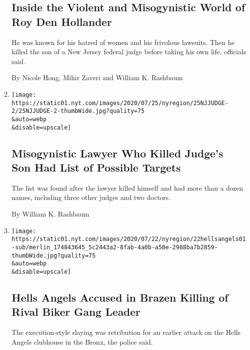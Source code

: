 \begin{enumerate}
  \hypertarget{inside-the-violent-and-misogynistic-world-of-roy-den-hollander}{%
  \subsection{Inside the Violent and Misogynistic World of Roy Den
  Hollander}\label{inside-the-violent-and-misogynistic-world-of-roy-den-hollander}}

  He was known for his hatred of women and his frivolous lawsuits. Then
  he killed the son of a New Jersey federal judge before taking his own
  life, officials said.

  By Nicole Hong, Mihir Zaveri and William K. Rashbaum
\item
  \href{/2020/07/25/nyregion/roy-den-hollander-esther-salas-list.html}{}

  \texttt{[image: https://static01.nyt.com/images/2020/07/25/nyregion/25NJJUDGE-2/25NJJUDGE-2-thumbWide.jpg?quality=75\\\&auto=webp\\\&disable=upscale]}

  \hypertarget{misogynistic-lawyer-who-killed-judges-son-had-list-of-possible-targets}{%
  \subsection{Misogynistic Lawyer Who Killed Judge's Son Had List of
  Possible
  Targets}\label{misogynistic-lawyer-who-killed-judges-son-had-list-of-possible-targets}}

  The list was found after the lawyer killed himself and had more than a
  dozen names, including three other judges and two doctors.

  By William K. Rashbaum
\item
  \href{/2020/07/22/nyregion/hells-angels-bronx-pagans-murder.html}{}

  \texttt{[image: https://static01.nyt.com/images/2020/07/22/nyregion/22hellsangels01-sub/merlin\_174843645\_5c2443a2-8fab-4a0b-a50e-2988ba7b2859-thumbWide.jpg?quality=75\\\&auto=webp\\\&disable=upscale]}

  \hypertarget{hells-angels-accused-in-brazen-killing-of-rival-biker-gang-leader}{%
  \subsection{Hells Angels Accused in Brazen Killing of Rival Biker Gang
  Leader}\label{hells-angels-accused-in-brazen-killing-of-rival-biker-gang-leader}}

  The execution-style slaying was retribution for an earlier attack on
  the Hells Angels clubhouse in the Bronx, the police said.


\end{enumerate}
